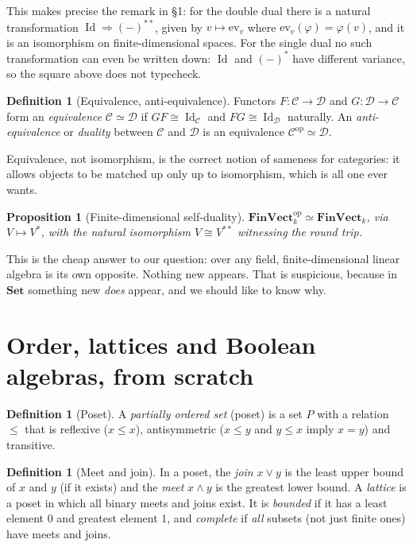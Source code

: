 \documentclass[11pt,a4paper]{article}
\newtheorem{proposition}[theorem]{Proposition}
\theoremstyle{definition}
\newtheorem{definition}[theorem]{Definition}
\theoremstyle{remark}
\newcommand{\dual}[1]{#1^{*}}
\newcommand{\cat}[1]{\mathbf{#1}}
\newcommand{\Set}{\cat{Set}}
\newcommand{\FinVect}{\cat{FinVect}}
\newcommand{\op}{\mathrm{op}}
\DeclareMathOperator{\Id}{Id}
\begin{document}
This makes precise the remark in \S1: for the double dual there is a natural transformation
$\Id \Rightarrow (-)^{**}$, given by $v \mapsto \mathrm{ev}_v$ where
$\mathrm{ev}_v(\varphi) = \varphi(v)$, and it is an isomorphism on finite-dimensional spaces.
For the single dual no such transformation can even be written down: $\Id$ and $(-)^{*}$ have
different variance, so the square above does not typecheck.

\begin{definition}[Equivalence, anti-equivalence]
Functors $F : \mathcal{C} \to \mathcal{D}$ and $G : \mathcal{D} \to \mathcal{C}$ form an
\emph{equivalence} $\mathcal{C} \simeq \mathcal{D}$ if $GF \cong \Id_{\mathcal{C}}$ and
$FG \cong \Id_{\mathcal{D}}$ naturally. An \emph{anti-equivalence} or \emph{duality} between
$\mathcal{C}$ and $\mathcal{D}$ is an equivalence $\mathcal{C}^{\op} \simeq \mathcal{D}$.
\end{definition}

Equivalence, not isomorphism, is the correct notion of sameness for categories: it allows
objects to be matched up only up to isomorphism, which is all one ever wants.

\begin{proposition}[Finite-dimensional self-duality]\label{prop:selfdual}
$\FinVect_k^{\op} \simeq \FinVect_k$, via $V \mapsto \dual{V}$, with the natural isomorphism
$V \cong V^{**}$ witnessing the round trip.
\end{proposition}

This is the cheap answer to our question: over any field, finite-dimensional linear algebra is
its own opposite. Nothing new appears. That is suspicious, because in $\Set$ something new
\emph{does} appear, and we should like to know why.

\section{Order, lattices and Boolean algebras, from scratch}\label{sec:lattices}

\begin{definition}[Poset]
A \emph{partially ordered set} (poset) is a set $P$ with a relation $\leq$ that is reflexive
($x \leq x$), antisymmetric ($x \leq y$ and $y \leq x$ imply $x = y$) and transitive.
\end{definition}

\begin{definition}[Meet and join]
In a poset, the \emph{join} $x \vee y$ is the least upper bound of $x$ and $y$ (if it exists)
and the \emph{meet} $x \wedge y$ is the greatest lower bound. A \emph{lattice} is a poset in
which all binary meets and joins exist. It is \emph{bounded} if it has a least element $0$ and
greatest element $1$, and \emph{complete} if \emph{all} subsets (not just finite ones) have
meets and joins.
\end{definition}
\end{document}
